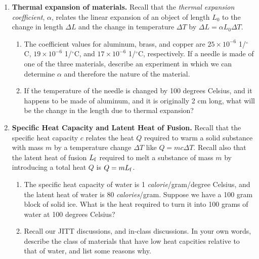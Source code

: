 \documentclass[10pt]{article}
\begin{document}
\maketitle

\begin{enumerate}
\item \textbf{Thermal expansion of materials.}  Recall that the \textit{thermal expansion coefficient}, $\alpha$, relates the linear expansion of an object of length $L_0$ to the change in length $\Delta L$ and the change in temperature $\Delta T$ by $\Delta L = \alpha L_0 \Delta T$.
\begin{enumerate}
\item The coefficient values for aluminum, brass, and copper are $25 \times 10^{-6}$ 1/$^{\circ}$C, $19 \times 10^{-6}$ 1/$^{\circ}$C, and $17 \times 10^{-6}$ 1/$^{\circ}$C, respectively.  If a needle is made of one of the three materials, describe an experiment in which we can determine $\alpha$ and therefore the nature of the material. \\ \vspace{2cm}
\item If the temperature of the needle is changed by 100 degrees Celsius, and it happens to be made of aluminum, and it is originally 2 cm long, what will be the change in the length due to thermal expansion? \\ \vspace{2cm}
\end{enumerate}
\item \textbf{Specific Heat Capacity and Latent Heat of Fusion.}  Recall that the specific heat capacity $c$ relates the heat $Q$ required to warm a solid substance with mass $m$ by a temperature change $\Delta T$ like $Q = m c \Delta T$.  Recall also that the latent heat of fusion $L_{\rm f}$ required to melt a substance of mass $m$ by introducing a total heat $Q$ is $Q = m L_{\rm f}$.
\begin{enumerate}
\item The specific heat capacity of water is 1 \textit{calorie}/gram/degree Celsius, and the latent heat of water is 80 \textit{calories}/gram.  Suppose we have a 100 gram block of solid ice.  What is the heat required to turn it into 100 grams of water at 100 degrees Celsius? \\ \vspace{2cm}
\item Recall our JITT discussions, and in-class discussions.  In your own words, describe the class of materials that have low heat capcities relative to that of water, and list some reasons why. \\ \vspace{3cm}

\end{enumerate}
\end{enumerate}
\end{document}
